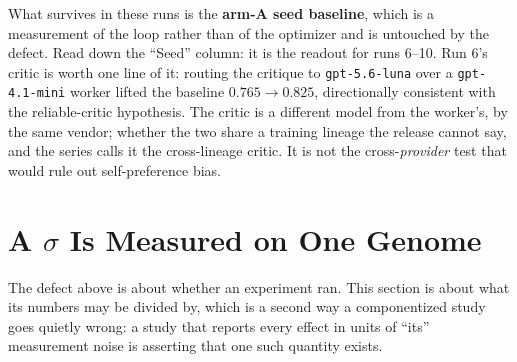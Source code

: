 \documentclass[11pt]{article}
\begin{document}
What survives in these runs is the \textbf{arm-A seed baseline}, which is a measurement of
the loop rather than of the optimizer and is untouched by the defect. Read down the ``Seed''
column: it is the readout for runs 6--10. Run
6's critic is worth one line of it: routing the critique to \texttt{gpt-5.6-luna} over a
\texttt{gpt-4.1-mini} worker lifted the baseline $0.765 \to 0.825$, directionally consistent
with the reliable-critic hypothesis. The critic is a different model from the worker's, by the
same vendor; whether the two share a training lineage the release cannot say, and the series calls it the
cross-lineage critic. It is not the cross-\emph{provider} test that would rule out self-preference
bias.

\section{A \texorpdfstring{$\sigma$}{Sigma} Is Measured on One Genome}
\label{sec:sigma}

The defect above is about whether an experiment ran. This section is about what its numbers may
be divided by, which is a second way a componentized study goes quietly wrong: a study that
reports every effect in units of ``its'' measurement noise is asserting that one such quantity
exists.
\end{document}

